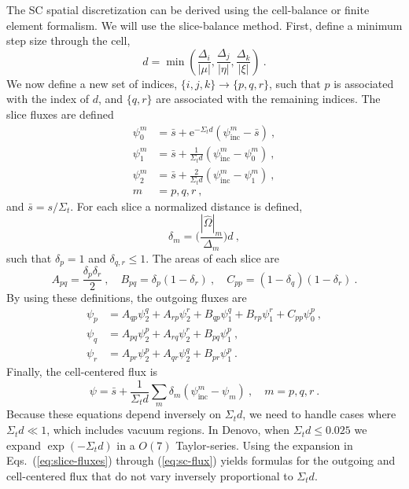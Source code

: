 \documentclass[12pt]{article}
\newcommand{\vOmega}{\ensuremath{\hat{\Omega}}}
\newcommand{\Di}{\ensuremath{\Delta_i}}
\newcommand{\Dj}{\ensuremath{\Delta_j}}
\newcommand{\Dk}{\ensuremath{\Delta_k}}
\begin{document}
The SC spatial discretization can be derived using the cell-balance or finite
element formalism.  We will use the slice-balance method.%
First, define a minimum step size through the
cell,
\begin{equation}
  d = \min\left(\frac{\Di}{|\mu|}, \frac{\Dj}{|\eta|},
    \frac{\Dk}{|\xi|}\right)\:.
\end{equation}
We now define a new set of indices, $\{i,j,k\}\rightarrow\{p,q,r\}$, such that
$p$ is associated with the index of $d$,
and $\{q,r\}$ are associated with the remaining indices.  The slice fluxes are
defined
\begin{equation}
  \begin{aligned}
    \psi^m_0 &= \bar{s} + \text{e}^{-\Sigma_t d}(\psi^m_{\text{inc}} -
    \bar{s})\:,\\ \psi^m_1 &= \bar{s} + \frac{1}{\Sigma_t d}(\psi^m_{\text{inc}}
    - \psi^m_0)\:,\\ \psi^m_2 &= \bar{s} + \frac{2}{\Sigma_t
      d}(\psi^m_{\text{inc}} - \psi^m_1)\:,\\ m &= p,q,r\:,
  \end{aligned}
  \label{eq:slice-fluxes}
\end{equation}
and $\bar{s} = s/\Sigma_t$.  For each slice a normalized distance is defined,
\begin{equation}
  \delta_m = \biggl(\frac{|\vOmega|_m}{\Delta_m}\biggr)d\:,
\end{equation}
such that $\delta_p = 1$ and $\delta_{q,r}\le 1$.  The areas of each slice are
\begin{equation}
  A_{pq} = \frac{\delta_p\delta_r}{2}\:,\quad B_{pq} =
  \delta_p(1-\delta_r)\:,\quad C_{pp} = (1-\delta_q)(1-\delta_r)\:.
\end{equation}
By using these definitions, the outgoing fluxes are
\begin{equation}
  \begin{aligned}
    \psi_p &= A_{qp}\psi_2^q + A_{rp}\psi_2^r + B_{qp}\psi_1^q +
    B_{rp}\psi_1^r + C_{pp}\psi_0^p\:,\\
    \psi_q &= A_{pq}\psi_2^p + A_{rq}\psi_2^r + B_{pq}\psi_1^p\:,\\
    \psi_r &= A_{pr}\psi_2^p + A_{qr}\psi_2^q + B_{pr}\psi_1^p\:.
  \end{aligned}
\end{equation}
Finally, the cell-centered flux is
\begin{equation}
  \psi = \bar{s} + \frac{1}{\Sigma_t
    d}\sum_{m}\delta_m(\psi_\text{inc}^m - \psi_m)\:,\quad m=p,q,r\:.
  \label{eq:sc-flux}
\end{equation}
Because these equations depend inversely on $\Sigma_t d$, we need to handle
cases where $\Sigma_t d \ll 1$, which includes vacuum regions.  In Denovo,
when $\Sigma_t d \le 0.025$ we expand $\exp(-\Sigma_t d)$ in a $O(7)$
Taylor-series.  Using the expansion in Eqs.~(\ref{eq:slice-fluxes}) through
(\ref{eq:sc-flux}) yields formulas for the outgoing and cell-centered flux
that do not vary inversely proportional to $\Sigma_t d$.
\end{document}
